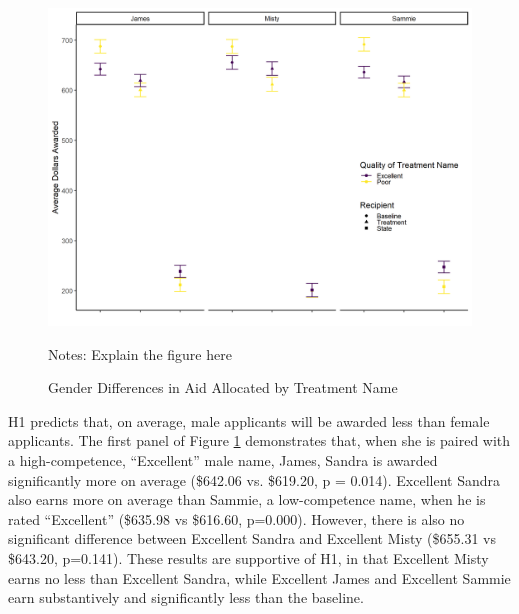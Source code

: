 \documentclass[12pt]{article}%
\begin{document}
\begin{doublespace}
\begin{figure}[h!]
	\centering
	\includegraphics[scale=.8]{figs/general-results-name.png}
	{\singlespacing
		\parbox{0.78\textwidth}{\scriptsize%
			Notes: Explain the figure here
	}}
	\caption{Gender Differences in Aid Allocated by Treatment Name}
	\label{results-main}
\end{figure}

H1 predicts that, on average, male applicants will be awarded less than female applicants. The first panel of Figure \ref{results-main} demonstrates that, when she is paired with a high-competence, ``Excellent” male name, James, Sandra is awarded significantly more on average (\$642.06 vs. \$619.20, p = 0.014). Excellent Sandra also earns more on average than Sammie, a low-competence name, when he is rated ``Excellent” (\$635.98 vs \$616.60, p=0.000). However, there is also no significant difference between Excellent Sandra and Excellent Misty (\$655.31 vs \$643.20, p=0.141). These results are supportive of H1, in that Excellent Misty earns no less than Excellent Sandra, while Excellent James and Excellent Sammie earn substantively and significantly less than the baseline.



\end{doublespace}
\end{document}
